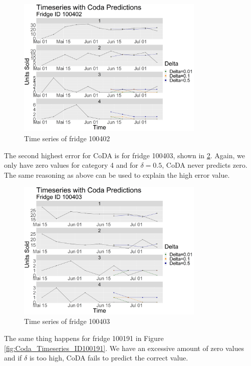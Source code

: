 \begin{figure}[htbp]
	\centering
		\includegraphics[width=0.80\textwidth]{Graphiken/Coda_Timeseries_VariationdL100402.png}
	\caption{Time series of fridge 100402}
	\label{fig:Coda_Timeseries_ID100402}
\end{figure}

The second highest error for CoDA is for fridge 100403, shown in \ref{fig:Coda_Timeseries_ID100403}. Again, we only have zero values for category 4 and for $\delta=0.5$, CoDA never predicts zero. The same reasoning as above can be used to explain the high error value. 

\begin{figure}[htbp]
	\centering
		\includegraphics[width=0.80\textwidth]{Graphiken/Coda_Timeseries_VariationdL100403.png}
	\caption{Time series of fridge 100403}
	\label{fig:Coda_Timeseries_ID100403}
\end{figure}

The same thing happens for fridge 100191 in Figure \ref{fig:Coda_Timeseries_ID100191}. We have an excessive amount of zero values and if $\delta$ is too high, CoDA fails to predict the correct value. 

